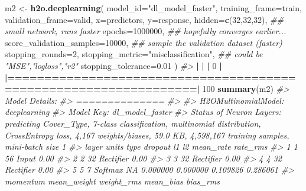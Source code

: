 \documentclass[]{book}
\newenvironment{Shaded}{\begin{snugshade}}{\end{snugshade}}
\newcommand{\CommentTok}[1]{\textcolor[rgb]{0.56,0.35,0.01}{\textit{#1}}}
\newcommand{\DataTypeTok}[1]{\textcolor[rgb]{0.13,0.29,0.53}{#1}}
\newcommand{\DecValTok}[1]{\textcolor[rgb]{0.00,0.00,0.81}{#1}}
\newcommand{\ErrorTok}[1]{\textcolor[rgb]{0.64,0.00,0.00}{\textbf{#1}}}
\newcommand{\FloatTok}[1]{\textcolor[rgb]{0.00,0.00,0.81}{#1}}
\newcommand{\KeywordTok}[1]{\textcolor[rgb]{0.13,0.29,0.53}{\textbf{#1}}}
\newcommand{\NormalTok}[1]{#1}
\newcommand{\OperatorTok}[1]{\textcolor[rgb]{0.81,0.36,0.00}{\textbf{#1}}}
\newcommand{\StringTok}[1]{\textcolor[rgb]{0.31,0.60,0.02}{#1}}
\begin{document}
\begin{Shaded}
\begin{Highlighting}[]
\NormalTok{m2 <-}\StringTok{ }\KeywordTok{h2o.deeplearning}\NormalTok{(}
  \DataTypeTok{model_id=}\StringTok{"dl_model_faster"}\NormalTok{, }
  \DataTypeTok{training_frame=}\NormalTok{train, }
  \DataTypeTok{validation_frame=}\NormalTok{valid,}
  \DataTypeTok{x=}\NormalTok{predictors,}
  \DataTypeTok{y=}\NormalTok{response,}
  \DataTypeTok{hidden=}\KeywordTok{c}\NormalTok{(}\DecValTok{32}\NormalTok{,}\DecValTok{32}\NormalTok{,}\DecValTok{32}\NormalTok{),                  }\CommentTok{## small network, runs faster}
  \DataTypeTok{epochs=}\DecValTok{1000000}\NormalTok{,                      }\CommentTok{## hopefully converges earlier...}
  \DataTypeTok{score_validation_samples=}\DecValTok{10000}\NormalTok{,      }\CommentTok{## sample the validation dataset (faster)}
  \DataTypeTok{stopping_rounds=}\DecValTok{2}\NormalTok{,}
  \DataTypeTok{stopping_metric=}\StringTok{"misclassification"}\NormalTok{, }\CommentTok{## could be "MSE","logloss","r2"}
  \DataTypeTok{stopping_tolerance=}\FloatTok{0.01}
\NormalTok{)}
\CommentTok{#> }
  \OperatorTok{|}\StringTok{                                                                       }
\StringTok{  }\ErrorTok{|}\StringTok{                                                                 }\ErrorTok{|}\StringTok{   }\DecValTok{0}\NormalTok{%}
  \OperatorTok{|}\StringTok{                                                                       }
\StringTok{  }\ErrorTok{|=================================================================|}\StringTok{ }\DecValTok{100}\NormalTok{%}
\KeywordTok{summary}\NormalTok{(m2)}
\CommentTok{#> Model Details:}
\CommentTok{#> ==============}
\CommentTok{#> }
\CommentTok{#> H2OMultinomialModel: deeplearning}
\CommentTok{#> Model Key:  dl_model_faster }
\CommentTok{#> Status of Neuron Layers: predicting Cover_Type, 7-class classification, multinomial distribution, CrossEntropy loss, 4,167 weights/biases, 59.0 KB, 4,598,167 training samples, mini-batch size 1}
\CommentTok{#>   layer units      type dropout       l1       l2 mean_rate rate_rms}
\CommentTok{#> 1     1    56     Input  0.00 %       NA       NA        NA       NA}
\CommentTok{#> 2     2    32 Rectifier  0.00 % 0.000000 0.000000  0.043019 0.202104}
\CommentTok{#> 3     3    32 Rectifier  0.00 % 0.000000 0.000000  0.000429 0.000214}
\CommentTok{#> 4     4    32 Rectifier  0.00 % 0.000000 0.000000  0.000959 0.002080}
\CommentTok{#> 5     5     7   Softmax      NA 0.000000 0.000000  0.109826 0.286061}
\CommentTok{#>   momentum mean_weight weight_rms mean_bias bias_rms}
}}}}}}
\end{Highlighting}
\end{Shaded}
\end{document}

